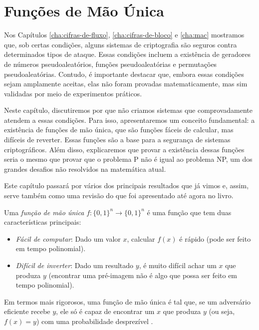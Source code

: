 \chapter{Funções de Mão Única}
\label{cha:owf}

Nos Capítulos \ref{cha:cifras-de-fluxo}, \ref{cha:cifras-de-bloco} e \ref{cha:mac} mostramos que, sob certas condições, alguns sistemas de criptografia são seguros contra determinados tipos de ataque.
Essas condições incluem a existência de geradores de números pseudoaleatórios, funções pseudoaleatórias e permutações pseudoaleatórias.
Contudo, é importante destacar que, embora essas condições sejam amplamente aceitas, elas não foram provadas matematicamente, mas sim validadas por meio de experimentos práticos.

Neste capítulo, discutiremos por que não criamos sistemas que comprovadamente atendem a essas condições.
Para isso, apresentaremos um conceito fundamental:
a existência de funções de mão única, que são funções fáceis de calcular, mas difíceis de reverter.
Essas funções são a base para a segurança de sistemas criptográficos.
Além disso, explicaremos que provar a existência dessas funções seria o mesmo que provar que o problema P não é igual ao problema NP, um dos grandes desafios não resolvidos na matemática atual.

Este capítulo passará por vários dos principais resultados que já vimos e, assim, serve também como uma revisão do que foi apresentado até agora no livro.

Uma {\em função de mão única} $f: \{0,1\}^n \to \{0,1\}^n$ é uma função que tem duas características principais:

\begin{itemize}
\item {\em Fácil de computar}:
  Dado um valor $x$, calcular $f(x)$ é rápido (pode ser feito em tempo polinomial).
    \item {\em Difícil de inverter}: Dado um resultado $y$, é muito difícil achar um $x$ que produza $y$ (encontrar uma pré-imagem não é algo que possa ser feito em tempo polinomial).
\end{itemize}

Em termos mais rigorosos, uma função de mão única é tal que, se um adversário eficiente recebe $y$, ele só é capaz de encontrar um $x$ que produza $y$ (ou seja, $f(x) = y$) com uma probabilidade desprezível \cite{Diffie76,Yao82}.

